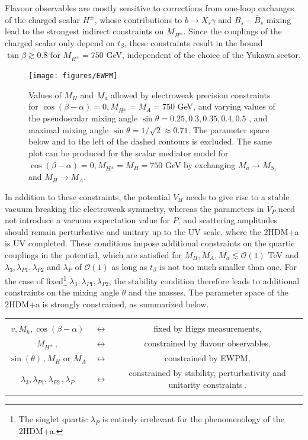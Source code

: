 Flavour observables are mostly sensitive to corrections from one-loop exchanges of the charged scalar ${H^\pm}$, whose contributions to $b \to X_s \gamma$ \cite{Hermann:2012fc,Misiak:2015xwa,Czakon:2015exa} and $B_s-\bar B_s$ mixing \cite{Abbott:1979dt,Geng:1988bq,Buras:1989ui,Eberhardt:2013uba} lead to the strongest indirect constraints on $M_{H^\pm}$. Since the couplings of the charged scalar only depend on $t_\beta$, these constraints result in the bound $\tan \beta \gtrsim 0.8$ for $M_{H^\pm}=750$ GeV, independent of the choice of the Yukawa sector.\\
\begin{figure}[t]
\centering
\texttt{[image: figures/EWPM]}
\caption{\label{fig:EWPM}Values of $M_H$ and $M_a$ allowed by electroweak precision constraints for $\cos(\beta-\alpha)=0, M_{H^\pm}=M_A=750$ GeV, and varying values of the pseudoscalar mixing angle $\sin \theta =0.25, 0.3, 0.35, 0.4, 0.5$ , and maximal mixing angle $\sin\theta =1/\sqrt{2}\approx 0.71$. The parameter space below and to the left of the dashed contours is excluded. The same plot can be produced for the scalar mediator model for $\cos(\beta-\alpha)=0, M_{H^\pm}=M_H=750$ GeV by exchanging $M_a\rightarrow M_{S_1}$ and $M_H\rightarrow M_{A}$. }
\end{figure}
In addition to these constraints, the potential $V_H$ needs to give rise to a stable vacuum breaking the electroweak symmetry, whereas the parameters in $V_P$ need not introduce a vacuum expectation value for $P$, and scattering amplitudes should remain perturbative \cite{Gunion:2002zf,Barroso:2013awa} and unitary \cite{Kanemura:1993hm,Akeroyd:2000wc,Ginzburg:2005dt,Grinstein:2015rtl} up to the UV scale, where the 2HDM+a is UV completed.  These conditions impose additional constraints on the quartic couplings in the potential, which are satisfied for $M_H, M_A, M_a \lesssim \mathcal{O}(1)$ TeV and $\lambda_3, \lambda_{P1}, \lambda_{P2}$ and $\lambda_P$ of $\mathcal{O}(1)$ as long as $t_\beta$ is not too much smaller than one. For the case of fixed\footnote{The singlet quartic $\lambda_P$ is entirely irrelevant for the phenomenology of the 2HDM+a.} $\lambda_3, \lambda_{P1}, \lambda_{P2}$, the stability condition therefore leads to additional constraints on the mixing angle $\theta$ and the masses. The parameter space of the 2HDM+a is strongly constrained, as summarized below.
%
\newline
\begin{tabular}{cc c}
&&\\
$v, M_h, \cos(\beta-\alpha) $&$\longleftrightarrow$& fixed by Higgs measurements,\\[.3cm]
$M_{H^\pm}\,, $  &$\longleftrightarrow $& constrained by flavour observables,\\[.3cm]
$\sin(\theta)\,, M_H \,\,\text{or} \,\,M_A$  &$\longleftrightarrow $& constrained by EWPM,\\[.3cm]
$\lambda_3, \lambda_{P1}, \lambda_{P2}\,,\lambda_P $ &$\longleftrightarrow $& constrained by stability, perturbativity and unitarity constraints\,.\\[.3cm]
&&
\end{tabular}
